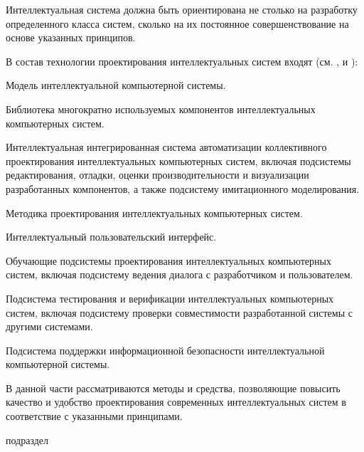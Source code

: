 \begin{partbacktext}
Интеллектуальная система должна быть ориентирована не столько на разработку определенного класса систем, сколько на их постоянное совершенствование на основе указанных принципов.

В состав технологии проектирования интеллектуальных систем входят (см. ,  и ):
\begin{textitemize}
	\item Модель интеллектуальной компьютерной системы.
	\item Библиотека многократно используемых компонентов интеллектуальных компьютерных систем.
	\item Интеллектуальная интегрированная система автоматизации коллективного проектирования интеллектуальных компьютерных систем, включая подсистемы редактирования, отладки, оценки производительности и визуализации разработанных компонентов, а также подсистему имитационного моделирования.
	\item Методика проектирования интеллектуальных компьютерных систем.
	\item Интеллектуальный пользовательский интерфейс.
	\item Обучающие подсистемы проектирования интеллектуальных компьютерных систем, включая подсистему ведения диалога с разработчиком и пользователем.
	\item Подсистема тестирования и верификации интеллектуальных компьютерных систем, включая подсистему проверки совместимости разработанной системы с другими системами.
	\item Подсистема поддержки информационной безопасности интеллектуальной компьютерной системы.
\end{textitemize}

В данной части рассматриваются методы и средства, позволяющие повысить качество и удобство проектирования современных интеллектуальных систем в соответствие с указанными принципами.

\bigskip

\begin{SCn}
\begin{scnrelfromlist}{подраздел}
\end{scnrelfromlist}
\end{SCn}

\end{partbacktext}




